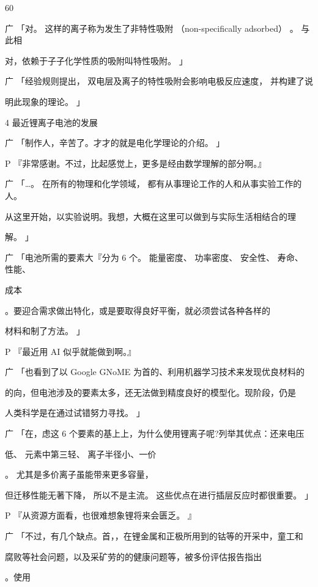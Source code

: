 60\par
广 「对。 这样的离子称为发生了非特性吸附 （non-specifically adsorbed） 。 与此相\par
对，依赖于子子化学性质的吸附叫特性吸附。 」\par
广 「经验规则提出， 双电层及离子的特性吸附会影响电极反应速度， 并构建了说\par
明此现象的理论。 」\par
4 最近锂离子电池的发展\par
广 「制作人，辛苦了。才才的就是电化学理论的介绍。 」\par
P 『非常感谢。不过，比起感觉上，更多是经由数学理解的部分啊。』\par
广 「…。 在所有的物理和化学领域， 都有从事理论工作的人和从事实验工作的人。\par
从这里开始，以实验说明。我想，大概在这里可以做到与实际生活相结合的理\par
解。 」\par
广 「电池所需的要素大『分为 6 个。 能量密度、 功率密度、 安全性、 寿命、 性能、\par
成本\par
[5]\par
。要迎合需求做出特化，或是要取得良好平衡，就必须尝试各种各样的\par
材料和制了方法。 」\par
P 『最近用 AI 似乎就能做到啊。』\par
广 「也看到了以 Google GNoME 为首的、利用机器学习技术来发现优良材料的\par
的向，但电池涉及的要素太多，还无法做到精度良好的模型化。现阶段，仍是\par
人类科学是在通过试错努力寻找。 」\par
广 「在，虑这 6 个要素的基上上，为什么使用锂离子呢?列举其优点：还来电压\par
低、 元素中第三轻、 离子半径小、一价\par
[6]\par
。 尤其是多价离子虽能带来更多容量，\par
但迁移性能无著下降， 所以不是主流。 这些优点在进行插层反应时都很重要。 」\par
P 『从资源方面看，也很难想象锂将来会匮乏。 』\par
广 「不过，有几个缺点。首，，在锂金属和正极所用到的钴等的开采中，童工和\par
腐败等社会问题，以及采矿劳的的健康问题等，被多份评估报告指出\par
[7]\par
。使用\par
